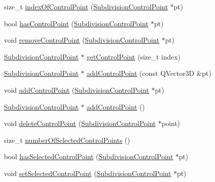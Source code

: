 \begin{DoxyCompactItemize}
size\-\_\-t \hyperlink{classShipCAD_1_1SubdivisionSurface_ae0dda53669e5767da6434b3e2f751916}{index\-Of\-Control\-Point} (\hyperlink{classShipCAD_1_1SubdivisionControlPoint}{Subdivision\-Control\-Point} $\ast$pt)
\item 
bool \hyperlink{classShipCAD_1_1SubdivisionSurface_a62abb29703f608a75559452d25db9a33}{has\-Control\-Point} (\hyperlink{classShipCAD_1_1SubdivisionControlPoint}{Subdivision\-Control\-Point} $\ast$pt)
\item 
void \hyperlink{classShipCAD_1_1SubdivisionSurface_aa20b9227481180329e03de8897c52933}{remove\-Control\-Point} (\hyperlink{classShipCAD_1_1SubdivisionControlPoint}{Subdivision\-Control\-Point} $\ast$pt)
\item 
\hyperlink{classShipCAD_1_1SubdivisionControlPoint}{Subdivision\-Control\-Point} $\ast$ \hyperlink{classShipCAD_1_1SubdivisionSurface_a8aa8d3fdfc5e81ba4a39858a69228652}{get\-Control\-Point} (size\-\_\-t index)
\item 
\hyperlink{classShipCAD_1_1SubdivisionControlPoint}{Subdivision\-Control\-Point} $\ast$ \hyperlink{classShipCAD_1_1SubdivisionSurface_af644edd0d4ba993dbab280f036b37171}{add\-Control\-Point} (const Q\-Vector3\-D \&pt)
\item 
void \hyperlink{classShipCAD_1_1SubdivisionSurface_a7ac8b717bcb728da2334cc2f16c8b428}{add\-Control\-Point} (\hyperlink{classShipCAD_1_1SubdivisionControlPoint}{Subdivision\-Control\-Point} $\ast$pt)
\item 
\hyperlink{classShipCAD_1_1SubdivisionControlPoint}{Subdivision\-Control\-Point} $\ast$ \hyperlink{classShipCAD_1_1SubdivisionSurface_a7eccf33cb39ef12f56553352da34da62}{add\-Control\-Point} ()
\item 
void \hyperlink{classShipCAD_1_1SubdivisionSurface_ad4f874132a137e89a39e60572748dab0}{delete\-Control\-Point} (\hyperlink{classShipCAD_1_1SubdivisionControlPoint}{Subdivision\-Control\-Point} $\ast$point)
\item 
size\-\_\-t \hyperlink{classShipCAD_1_1SubdivisionSurface_ac15e844f2feb644d71b1de3a886f6970}{number\-Of\-Selected\-Control\-Points} ()
\item 
bool \hyperlink{classShipCAD_1_1SubdivisionSurface_aafd696ac2c5353ac5593acdbe8b1fb2e}{has\-Selected\-Control\-Point} (\hyperlink{classShipCAD_1_1SubdivisionControlPoint}{Subdivision\-Control\-Point} $\ast$pt)
\item 
void \hyperlink{classShipCAD_1_1SubdivisionSurface_a65cc43d93da8ed72af631e893057c773}{set\-Selected\-Control\-Point} (\hyperlink{classShipCAD_1_1SubdivisionControlPoint}{Subdivision\-Control\-Point} $\ast$pt)

\end{DoxyCompactItemize}
